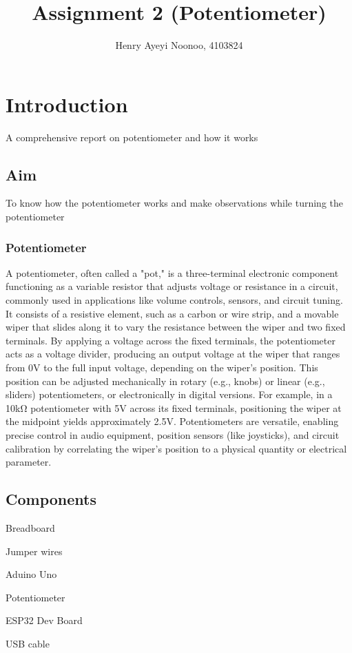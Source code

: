 \documentclass{article}
\title{Assignment 2 (Potentiometer)}
\author{Henry Ayeyi Noonoo, 4103824}
\begin{document}
\maketitle


\section{Introduction}

A comprehensive report on potentiometer and how it works

\subsection{Aim}

To know how the potentiometer works and make observations while turning the potentiometer

\subsubsection{Potentiometer}
A potentiometer, often called a "pot," is a three-terminal electronic component functioning as a variable resistor that adjusts voltage or resistance in a circuit, commonly used in applications like volume controls, sensors, and circuit tuning. It consists of a resistive element, such as a carbon or wire strip, and a movable wiper that slides along it to vary the resistance between the wiper and two fixed terminals. By applying a voltage across the fixed terminals, the potentiometer acts as a voltage divider, producing an output voltage at the wiper that ranges from 0V to the full input voltage, depending on the wiper’s position. This position can be adjusted mechanically in rotary (e.g., knobs) or linear (e.g., sliders) potentiometers, or electronically in digital versions. For example, in a 10kΩ potentiometer with 5V across its fixed terminals, positioning the wiper at the midpoint yields approximately 2.5V. Potentiometers are versatile, enabling precise control in audio equipment, position sensors (like joysticks), and circuit calibration by correlating the wiper’s position to a physical quantity or electrical parameter.
\subsection{Components}

 \item  Breadboard
 \item  Jumper wires
 \item  Aduino Uno
 \item  Potentiometer
 \item  ESP32 Dev Board
 \item  USB cable
\end{document}
